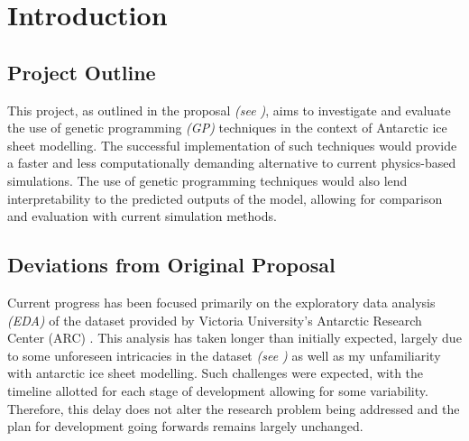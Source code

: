 \chapter{Introduction}\label{C:introduction}

\section{Project Outline}

This project, as outlined in the proposal \textit{(see )}, aims to investigate and evaluate the use of genetic programming \textit{(GP)} techniques in the context of Antarctic ice sheet modelling. The successful implementation of such techniques would provide a faster and less computationally demanding alternative to current physics-based simulations. The use of genetic programming  techniques would also lend interpretability to the predicted outputs of the model, allowing for comparison and evaluation with current simulation methods.

\section{Deviations from Original Proposal}

Current progress has been focused primarily on the exploratory data analysis \textit{(EDA)} of the  dataset provided by Victoria University’s Antarctic Research Center (ARC) . This analysis has taken longer than initially expected, largely due to some unforeseen intricacies in the dataset \textit{(see )} as well as my unfamiliarity with antarctic ice sheet modelling. Such challenges were expected, with the timeline allotted for each stage of development allowing for some variability. Therefore, this delay does not alter the research problem being addressed and the plan for development going forwards remains largely unchanged.